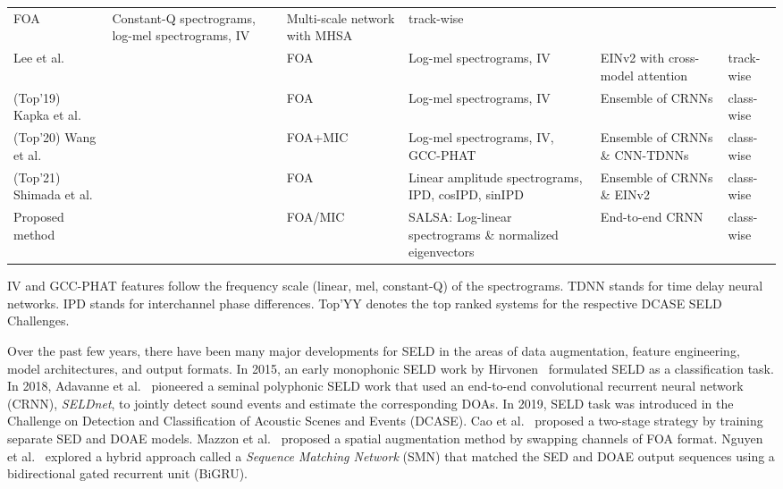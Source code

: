 \documentclass[journal]{IEEEtran}
\newcommand*{\etal}{ et al.\ \xspace}
\newcommand{\etalcite}[1]{ et al.~\cite{#1}}
\newcommand*{\gccphat}{\mbox{GCC-PHAT}\xspace}
\newcommand{\aname}[1]{\emph{#1}}
\begin{document}
\begin{table*}[t]
{\begin{tabularx}{\textwidth}{l@{ }llXll}
        FOA & 
        Constant-Q spectrograms, log-mel spectrograms, IV  &   
        Multi-scale network with MHSA   & 
        track-wise \\
    Lee\etal{} & \cite{Lee2021SoundChallenge}   &   
        FOA         & 
        Log-mel spectrograms, IV     & 
        EINv2 with cross-model attention   & 
        track-wise \\
\midrule
    (Top'19) Kapka\etal{} & \cite{Kapka2019SoundModels}     &   
        FOA         & 
        Log-mel spectrograms, IV     & 
        Ensemble of CRNNs &   
        class-wise \\
    (Top'20) Wang\etal{} & \cite{Wang2020TheChallenge}   &   
        FOA+MIC   & 
        Log-mel spectrograms, IV, GCC-PHAT  & 
        Ensemble of CRNNs \& CNN-TDNNs   &   
        class-wise \\
    (Top'21) Shimada\etal{} & \cite{Shimada2021EnsembleDetection} &   
        FOA     & 
        Linear amplitude spectrograms, IPD, cosIPD, sinIPD     & 
        Ensemble of CRNNs \& EINv2  & 
        class-wise \\
\midrule 
    Proposed method    & &
        FOA/MIC  & 
        SALSA: Log-linear spectrograms \& normalized eigenvectors & 
        End-to-end CRNN &     
        class-wise \\ 
\bottomrule 
\end{tabularx}
}     
    \begin{justify}
        IV and \gccphat features follow the frequency scale (linear, mel, constant-Q) of the spectrograms. TDNN stands for time delay neural networks. IPD stands for interchannel phase differences. Top'YY denotes the top ranked systems for the respective DCASE SELD Challenges.
    \end{justify}
\end{table*}

Over the past few years, there have been many major developments for SELD in the areas of data augmentation, feature engineering, model architectures, and output formats. In 2015, an early monophonic SELD work by Hirvonen~\cite{Hirvonen2015ClassificationNetworks} formulated SELD as a classification task. In 2018, Adavanne\etalcite{Adavanne2019SoundNetworks} pioneered a seminal polyphonic SELD work that used an end-to-end convolutional recurrent neural network (CRNN), \aname{SELDnet}, to jointly detect sound events and estimate the corresponding DOAs. In 2019, SELD task was introduced in the Challenge on Detection and Classification of Acoustic Scenes and Events (DCASE). Cao\etalcite{Cao2019PolyphonicStrategy} proposed a two-stage strategy by training separate SED and DOAE models.
Mazzon\etalcite{Mazzon2019FirstEstimation} proposed a spatial augmentation method by swapping channels of FOA format. 
Nguyen\etalcite{Nguyen2020ADetection, Nguyen2021ANetwork} explored a hybrid approach called a \aname{Sequence Matching Network} (SMN) that matched the SED and DOAE output sequences using a bidirectional gated recurrent unit (BiGRU).
\end{document}
